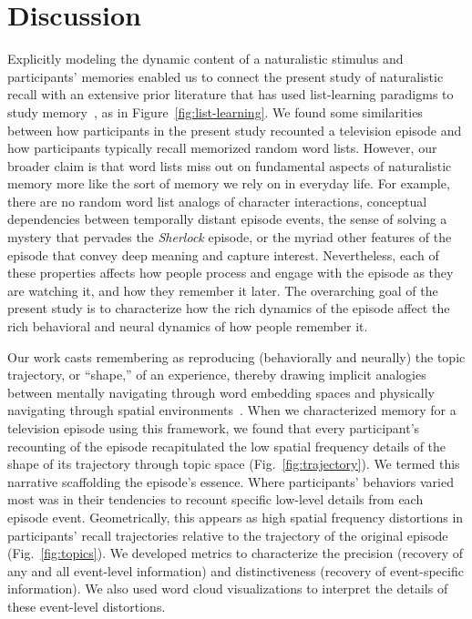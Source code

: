 \documentclass[10pt]{article}
\begin{document}
\section*{Discussion}
\label{sec:discussion}

Explicitly modeling the dynamic content of a naturalistic stimulus and participants' memories enabled us to connect the present study of naturalistic recall with an extensive prior literature that has used list-learning paradigms to study memory~\citep[for review see][]{Kaha12}, as in Figure~\ref{fig:list-learning}.  We found some similarities between how participants in the present study recounted a television episode and how participants typically recall memorized random word lists.  However, our broader claim is that word lists miss out on fundamental aspects of naturalistic memory more like the sort of memory we rely on in everyday life.  For example, there are no random word list analogs of character interactions, conceptual dependencies between temporally distant episode events, the sense of solving a mystery that pervades the \textit{Sherlock} episode, or the myriad other features of the episode that convey deep meaning and capture interest.  Nevertheless, each of these properties affects how people process and engage with the episode as they are watching it, and how they remember it later.  The overarching goal of the present study is to characterize how the rich dynamics of the episode affect the rich behavioral and neural dynamics of how people remember it.

Our work casts remembering as reproducing (behaviorally and neurally) the topic trajectory, or ``shape,'' of an experience, thereby drawing implicit analogies between mentally navigating through word embedding spaces and physically navigating through spatial environments~\citep[e.g.,][]{BellEtal18, BellEtal20, ConsEtal16}.  When we characterized memory for a television episode using this framework, we found that every participant's recounting of the episode recapitulated the low spatial frequency details of the shape of its trajectory through topic space (Fig.~\ref{fig:trajectory}).  We termed this narrative scaffolding the episode's essence.  Where participants' behaviors varied most was in their tendencies to recount specific low-level details from each episode event.  Geometrically, this appears as high spatial frequency distortions in participants' recall trajectories relative to the trajectory of the original episode (Fig.~\ref{fig:topics}).  We developed metrics to characterize the precision (recovery of any and all event-level information) and distinctiveness (recovery of event-specific information).  We also used word cloud visualizations to interpret the details of these event-level distortions.
\end{document}
